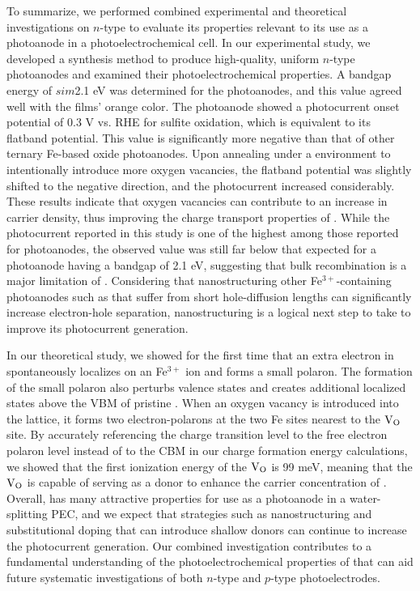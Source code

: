 To summarize, we performed combined experimental and theoretical investigations on $n$-type  to evaluate its properties relevant to its use as a photoanode in a photoelectrochemical cell. In our experimental study, we developed a synthesis method to produce high-quality, uniform $n$-type  photoanodes and examined their photoelectrochemical properties. A bandgap energy of $sim$2.1 eV was determined for the  photoanodes, and this value agreed well with the films’ orange color. The  photoanode showed a photocurrent onset potential of 0.3 V vs. RHE for sulfite oxidation, which is equivalent to its flatband potential. This value is significantly more negative than that of other ternary Fe-based oxide photoanodes. Upon annealing under a  environment to intentionally introduce more oxygen vacancies, the flatband potential was slightly shifted to the negative direction, and the photocurrent increased considerably. These results indicate that oxygen vacancies can contribute to an increase in carrier density, thus improving the charge transport properties of . While the photocurrent reported in this study is one of the highest among those reported for  photoanodes, the observed value was still far below that expected for a photoanode having a bandgap of 2.1 eV, suggesting that bulk recombination is a major limitation of . Considering that nanostructuring other Fe$^{3+}$-containing photoanodes such as  that suffer from short hole-diffusion lengths can significantly increase electron-hole separation, nanostructuring  is a logical next step to take to improve its photocurrent generation.

In our theoretical study, we showed for the first time that an extra electron in  spontaneously localizes on an Fe$^{3+}$ ion and forms a small polaron. The formation of the small polaron also perturbs valence states and creates additional localized states above the VBM of pristine . When an oxygen vacancy is introduced into the  lattice, it forms two electron-polarons at the two Fe sites nearest to the $\rm V_O$ site. By accurately referencing the charge transition level to the free electron polaron level instead of to the CBM in our charge formation energy calculations, we showed that the first ionization energy of the $\rm V_O$ is 99 meV, meaning that the $\rm V_O$ is capable of serving as a donor to enhance the carrier concentration of .
Overall,  has many attractive properties for use as a photoanode in a water-splitting PEC, and we expect that strategies such as nanostructuring and substitutional doping that can introduce shallow donors can continue to increase the photocurrent generation. Our combined investigation contributes to a fundamental understanding of the photoelectrochemical properties of  that can aid future systematic investigations of both $n$-type and $p$-type  photoelectrodes.




